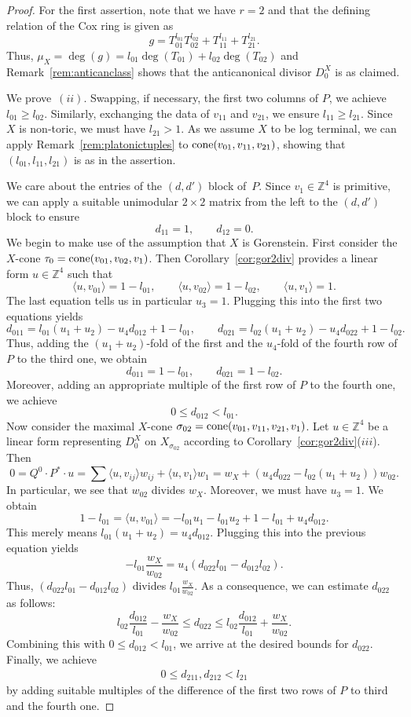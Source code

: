 \documentclass[10pt,a4paper]{amsart}
\theoremstyle{definition}
\def\ZZ{{\mathbb Z}}
\def\bangle#1{{\langle #1 \rangle}}
\def\cone{{\rm cone}}
\numberwithin{equation}{section}
\begin{document}
\begin{proof}
For the first assertion, note that we have
$r = 2$ and that the defining relation of
the Cox ring is given as
\[
g = T_{01}^{l_{01}}T_{02}^{l_{02}} + T_{11}^{l_{11}} + T_{21}^{l_{21}} .
\]
Thus, $\mu_X = \deg(g) = l_{01}\deg(T_{01}) + l_{02}\deg(T_{02})$
and Remark~\ref{rem:anticanclass} shows that
the anticanonical divisor $D^X_0$ is as claimed.

We prove~$(ii)$.
Swapping, if necessary, the first two
columns of $P$, we achieve
$l_{01} \ge l_{02}$.
Similarly, exchanging the data of
$v_{11}$ and $v_{21}$, we ensure
$l_{11} \ge l_{21}$.
Since~$X$ is non-toric, we must have
$l_{21} > 1$.
As we assume $X$ to be log terminal, we
can apply Remark~\ref{rem:platonictuples}
to $\cone(v_{01},v_{11},v_{21})$, showing that
$(l_{01},l_{11},l_{21})$ is as in the assertion.

We care about the entries of the $(d,d')$ block of~$P$.
Since $v_1 \in \ZZ^4$ is primitive, we can
apply a suitable unimodular $2 \times 2$ matrix from
the left to the $(d,d')$ block to ensure
\[
d_{11} = 1,\qquad
d_{12} = 0.
\]
We begin to make use of the assumption that
$X$ is Gorenstein.
First consider the $X$-cone $\tau_0 = \cone(v_{01},v_{02},v_1)$.
Then Corollary~\ref{cor:gor2div} provides a linear form
$u \in \ZZ^4$ such that
\[
\bangle{u,v_{01}} = 1-l_{01},\qquad
\bangle{u,v_{02}} = 1-l_{02},\qquad
\bangle{u,v_{1}} = 1.
\]
The last equation tells us in particular $u_3 = 1$.
Plugging this into the first two equations yields
\[
d_{011} = l_{01}(u_1+u_2) - u_4 d_{012} + 1-l_{01},\qquad
d_{021} = l_{02}(u_1+u_2) - u_4 d_{022} + 1-l_{02}.
\]
Thus, adding the $(u_1+u_2)$-fold of the first
and the $u_4$-fold of the fourth row of $P$
to the third one, we obtain
\[
d_{011} = 1-l_{01},\qquad
d_{021} = 1-l_{02}.
\]
Moreover, adding an appropriate multiple of the first row
of $P$ to the fourth one, we achieve
\[
0 \le d_{012} < l_{01}.
\]
Now consider the maximal $X$-cone
$\sigma_{02} = \cone(v_{01},v_{11},v_{21},v_1)$.
Let $u \in \ZZ^4$ be a linear form
representing $D_0^X$ on $X_{\sigma_{02}}$ according to
Corollary~\ref{cor:gor2div}($iii$).
Then
\[
0=Q^0 \cdot P^* \cdot u =
\sum \bangle{u,v_{ij}}w_{ij} + \bangle{u,v_1}w_1
 =w_X + (u_4 d_{022} - l_{02}(u_1 + u_2)) w_{02}.
\]
In particular, we see that $w_{02}$ divides $w_X$.
Moreover, we must have $u_3=1$. We obtain
\[
1-l_{01} =\bangle{u,v_{01}} =
-l_{01}u_1 - l_{01}u_2 + 1-l_{01} + u_4d_{012}.
\]
This merely means $l_{01}(u_1 + u_2)=u_4d_{012}$.
Plugging this into the previous equation yields
\[
- l_{01} \frac{w_X}{w_{02}} =
u_4 (d_{022}l_{01}-d_{012}l_{02}).
\]
Thus, $(d_{022}l_{01}-d_{012}l_{02})$ divides $l_{01}\frac{w_X}{w_{02}}$.
As a consequence, we can estimate $d_{022}$ as follows:
\[
l_{02}\frac{d_{012}}{l_{01}} - \frac{w_X}{w_{02}}
 \le
d_{022}
 \le
l_{02}\frac{d_{012}}{l_{01}} + \frac{w_X}{w_{02}}.
\]
Combining this with $0 \leq d_{012} < l_{01}$, we arrive
at the desired bounds for $d_{022}$.
Finally, we achieve
\begin{gather*}
0 \le d_{211}, d_{212} < l_{21}
\end{gather*}
by adding suitable multiples of the difference of the first
two rows of $P$ to third and the fourth one.
\end{proof}
\end{document}
